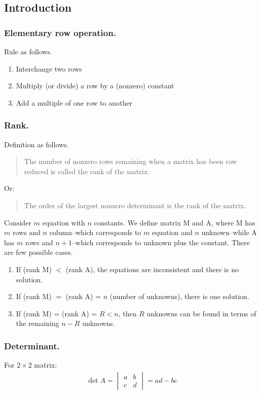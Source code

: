 \documentclass[../main.tex]{subfiles}
\begin{document}
\subsection*{Introduction}
\subsubsection*{Elementary row operation.} Rule as follows.
\begin{enumerate}
	\item Interchange two rows
	\item Multiply (or divide) a row by a (nonzero) constant
	\item Add a multiple of one row to another
\end{enumerate}

\subsubsection*{Rank.} Definition as follows.
\begin{quote}
	The number of nonzero rows remaining when a matrix has been row reduced is called the rank of the matrix.
\end{quote}
Or:
\begin{quote}
	The order of the largest nonzero determinant is the rank of the matrix.
\end{quote}

Consider $m$ equation with $n$ constants. We define matrix M and A, where M has $m$ rows and $n$ column--which corresponds to $m$ equation and $n$ unknown--while A has $m$ rows and $n+1$--which corresponds to unknown plus the constant. There are few possible cases.
\begin{enumerate}
	\item If (rank M) $<$ (rank A), the equations are inconsistent and there is no solution.
	\item If (rank M) $=$ (rank A) = $n$ (number of unknowns), there is one solution.
	\item If (rank M) = (rank A) = $R < n$, then $R$ unknowns can be found in terms of the remaining $n-R$ unknowns.
\end{enumerate}

\subsubsection*{Determinant.} For $2\times 2$ matrix:
\begin{align*}
	\det A=\begin{vmatrix}
		       a & b \\
		       c & d
	       \end{vmatrix}=ad-bc
\end{align*}
\end{document}
